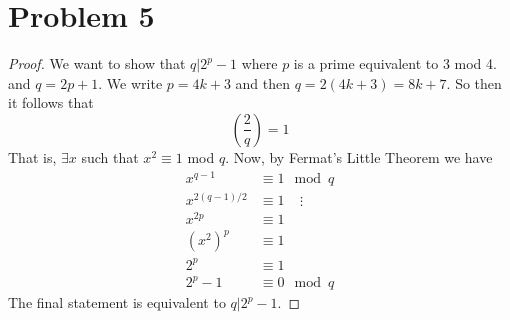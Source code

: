 \documentclass{article}
\theoremstyle{definition}
\begin{document}
\section*{Problem 5}
\begin{proof}
    We want to show that $q | 2^p - 1$ where $p$ is a prime equivalent to 3 mod 4. and $q = 2p + 1$.
    We write $p = 4k + 3$ and then $q = 2(4k + 3) = 8k + 7$. So then it follows that 
    \[
        \left(\frac{2}{q}\right) = 1 
    \]
    That is, $\exists x$ such that $x^2 \equiv 1$ mod $q$. Now, by Fermat's Little Theorem we have 
    \begin{align*}
        x^{q - 1}  &\equiv 1 \mod{q}\\
        x^{2(q-1)/2} &\equiv 1 \ \ \ \ \ \vdots \\
         x^{2p} &\equiv 1 \\
        (x^2)^p &\equiv 1 \\
        2^p &\equiv 1 \\
        2^p - 1 &\equiv 0 \mod{q}
    \end{align*}
    The final statement is equivalent to $q | 2^p - 1$.
\end{proof}
\end{document}
